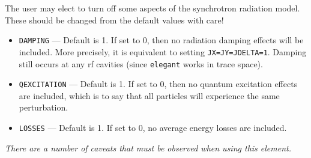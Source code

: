 The user may elect to turn off some aspects of the synchrotron radiation model.  These should be
changed from the default values with care!
\begin{itemize}
\item \verb|DAMPING| --- Default is 1.  If set to 0, then no radiation damping effects will be included.
  More precisely, it is equivalent to setting \verb|JX=JY=JDELTA=1|.  Damping still occurs at any
  rf cavities (since {\tt elegant} works in trace space).
\item \verb|QEXCITATION| --- Default is 1.  If set to 0, then no quantum excitation effects are included,
  which is to say that all particles will experience the same perturbation.  
\item \verb|LOSSES| --- Default is 1.  If set to 0, no average energy losses are included.
\end{itemize}
  

{\em There are a number of caveats that must be observed when using this element.}

